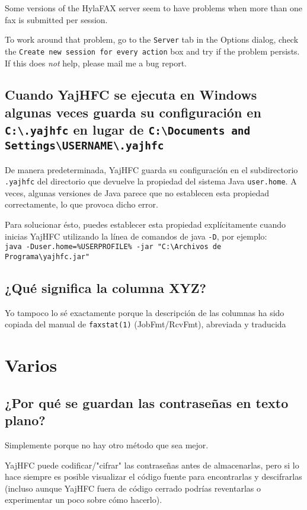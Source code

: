 \documentclass[a4paper,10pt]{scrartcl}
\begin{document}
Some versions of the HylaFAX server seem to have problems when more than one fax is submitted per session.

To work around that problem, go to the \texttt{Server} tab in the Options dialog, check the \texttt{Create new session for every action} box and try if the problem persists.
If this does \emph{not} help, please mail me a bug report.


\subsection{Cuando YajHFC se ejecuta en Windows algunas veces guarda su configuración en \texttt{C:\textbackslash .yajhfc} en lugar de \texttt{C:\textbackslash Documents and Settings\textbackslash USERNAME\textbackslash .yajhfc}}

De manera predeterminada, YajHFC guarda su configuración en el subdirectorio \texttt{.yajhfc} del directorio que devuelve
la propiedad del sistema Java \texttt{user.home}.
A veces, algunas versiones de Java parece que no establecen esta propiedad correctamente, lo que provoca dicho error.

Para solucionar ésto, puedes establecer esta propiedad explícitamente cuando inicias YajHFC utilizando la línea de comandos de java \texttt{-D}, por ejemplo:\\
\texttt{java -Duser.home=\%USERPROFILE\% -jar "C:\textbackslash Archivos de Programa\textbackslash yajhfc.jar"}

\subsection{¿Qué significa la columna XYZ?}

Yo tampoco lo sé exactamente porque la descripción de las columnas ha sido copiada del manual de  \verb#faxstat(1)# (JobFmt/RcvFmt), abreviada y traducida

\section{Varios}

\subsection{¿Por qué se guardan las contraseñas en texto plano?}

Simplemente porque no hay otro método que sea mejor.


YajHFC puede codificar/"cifrar" las contraseñas antes de almacenarlas, 
pero si lo hace siempre es posible visualizar el código fuente para encontrarlas 
y descifrarlas (incluso aunque YajHFC fuera de código cerrado podrías reventarlas o experimentar un poco sobre cómo hacerlo).
\end{document}
